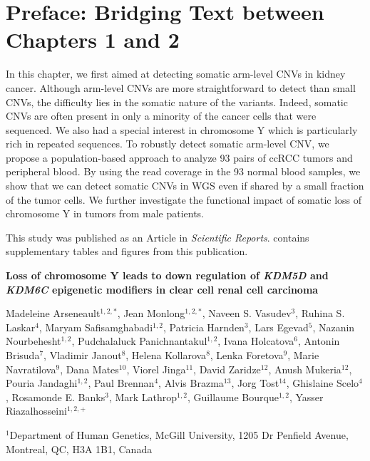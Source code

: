 \section*{Preface: Bridging Text between Chapters 1 and 2}

In this chapter, we first aimed at detecting somatic arm-level CNVs in kidney cancer.
Although arm-level CNVs are more straightforward to detect than small CNVs, the difficulty lies in the somatic nature of the variants.
Indeed, somatic CNVs are often present in only a minority of the cancer cells that were sequenced.
We also had a special interest in chromosome Y which is particularly rich in repeated sequences.
To robustly detect somatic arm-level CNV, we propose a population-based approach to analyze 93 pairs of ccRCC tumors and peripheral blood.
By using the read coverage in the 93 normal blood samples, we show that we can detect somatic CNVs in WGS even if shared by a small fraction of the tumor cells.
We further investigate the functional impact of somatic loss of chromosome Y in tumors from male patients.

This study was published as an Article in {\it Scientific Reports}\cite{Arseneault2017}.
 contains supplementary tables and figures from this publication.

\newpage
\singlespacing

\begin{center}
  \LARGE\bf Loss of chromosome Y leads to down regulation of {\it KDM5D} and {\it KDM6C} epigenetic modifiers in clear cell renal cell carcinoma
\end{center}
\bigskip

\large{Madeleine Arseneault$^{1,2,*}$, Jean Monlong$^{1,2,*}$, Naveen S. Vasudev$^{3}$, Ruhina S. Laskar$^{4}$, Maryam Safisamghabadi$^{1,2}$, Patricia Harnden$^{3}$, Lars Egevad$^{5}$, Nazanin Nourbehesht$^{1,2}$, Pudchalaluck Panichnantakul$^{1,2}$, Ivana Holcatova$^{6}$, Antonin Brisuda$^{7}$, Vladimir Janout$^{8}$, Helena Kollarova$^{8}$, Lenka Foretova$^{9}$, Marie Navratilova$^{9}$, Dana Mates$^{10}$, Viorel Jinga$^{11}$, David Zaridze$^{12}$, Anush Mukeria$^{12}$, Pouria Jandaghi$^{1,2}$, Paul Brennan$^{4}$, Alvis Brazma$^{13}$, Jorg Tost$^{14}$, Ghislaine Scelo$^{4}$, Rosamonde E. Banks$^{3}$, Mark Lathrop$^{1,2}$, Guillaume Bourque$^{1,2}$, Yasser Riazalhosseini$^{1,2,+}$}
\bigskip

\footnotesize
$^1$Department of Human Genetics, McGill University, 1205 Dr Penfield
Avenue, Montreal, QC, H3A 1B1, Canada

